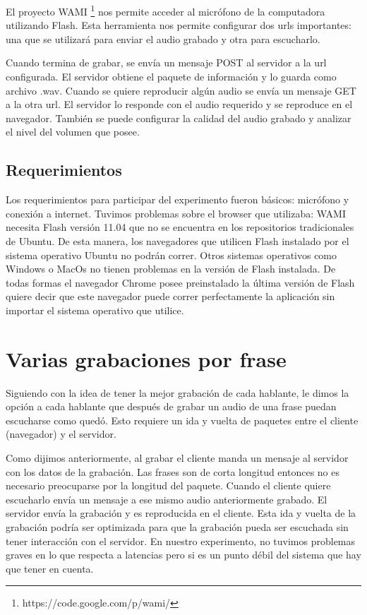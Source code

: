 El proyecto WAMI \footnote{https://code.google.com/p/wami/} nos permite acceder al micrófono de la computadora utilizando Flash.
Esta herramienta nos permite configurar dos urls importantes: una que se utilizará para enviar el audio grabado y otra para escucharlo.  

Cuando termina de grabar, se envía un mensaje POST al servidor a la url configurada. El servidor obtiene el paquete de información y lo guarda como archivo .wav. Cuando se quiere reproducir algún audio se envía un mensaje GET a la otra url. El servidor lo responde con el audio requerido y se reproduce en el navegador. También se puede configurar la calidad del audio grabado y analizar el nivel del volumen que posee. 

\subsection{Requerimientos}

Los requerimientos para participar del experimento fueron básicos: micrófono y conexión a internet. Tuvimos problemas sobre el browser que utilizaba: WAMI necesita Flash versión 11.04 que no se encuentra en los repositorios tradicionales de Ubuntu. De esta manera, los navegadores que utilicen Flash instalado por el sistema operativo Ubuntu no podrán correr. Otros sistemas operativos como Windows o MacOs no tienen problemas en la versión de Flash instalada. De todas formas el navegador Chrome posee preinstalado la última versión de Flash quiere decir que este navegador puede correr perfectamente la aplicación sin importar el sistema operativo que utilice.

\section{Varias grabaciones por frase}

Siguiendo con la idea de tener la mejor grabación de cada hablante, le dimos la opción a cada hablante que después de grabar un audio de una frase puedan escucharse como quedó. Esto requiere un ida y vuelta de paquetes entre el cliente (navegador) y el servidor. 

Como dijimos anteriormente, al grabar el cliente manda un mensaje al servidor con los datos de la grabación. Las frases son de corta longitud entonces no es necesario preocuparse por la longitud del paquete. Cuando el cliente quiere escucharlo envía un mensaje a ese mismo audio anteriormente grabado. El servidor envía la grabación y es reproducida en el cliente. Esta ida y vuelta de la grabación podría ser optimizada para que la grabación pueda ser escuchada sin tener interacción con el servidor. En nuestro experimento, no tuvimos problemas graves en lo que respecta a latencias pero si es un punto débil del sistema que hay que tener en cuenta.

